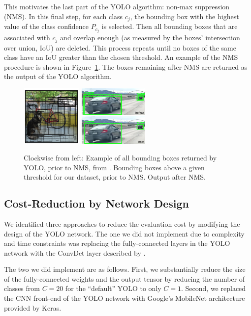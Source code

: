 \documentclass{article}
\begin{document}
This motivates the last part of the YOLO algorithm: non-max suppression (NMS). In this final step, for each class $c_j$, the bounding box with the highest value of the class confidence $P_{c_j}$ is selected. Then all bounding boxes that are associated with $c_j$ and overlap enough (as measured by the boxes' intersection over union, IoU) are deleted. This process repeats until no boxes of the same class have an IoU greater than the chosen threshold. An example of the NMS procedure is shown in Figure~\ref{fig:nms}. The boxes remaining after NMS are returned as the output of the YOLO algorithm.

\begin{figure}[t]
  \centering
  \includegraphics[height=3cm]{yolo_allboxes}
  \includegraphics[height=3cm]{nms_diagram}
  \caption{Clockwise from left: Example of all bounding boxes returned by YOLO, prior to NMS, from \cite{YOLO}. Bounding boxes above a given threshold for our dataset, prior to NMS. Output after NMS.}
  \label{fig:nms}
\end{figure}


\subsection{Cost-Reduction by Network Design}

We identified three approaches to reduce the evaluation cost by modifying the design of the YOLO network. The one we did not implement due to complexity and time constraints was replacing the fully-connected layers in the YOLO network with the ConvDet layer described by \cite{wu_convdet}.

The two we did implement are as follows. First, we substantially reduce the size of the fully-connected weights and the output tensor by reducing the number of classes from $C=20$ for the ``default'' YOLO to only $C=1$. Second, we replaced the CNN front-end of the YOLO network with Google's MobileNet architecture provided by Keras.
\end{document}
